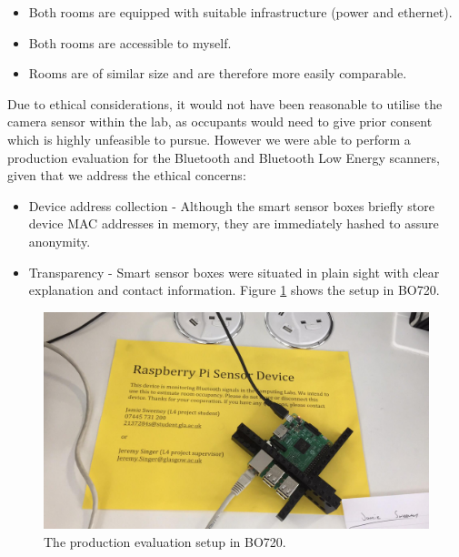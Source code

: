 \documentclass{l4proj}
\begin{document}
\begin{itemize}	
  \item Both rooms are equipped with suitable infrastructure (power and ethernet).
  \item Both rooms are accessible to myself.
  \item Rooms are of similar size and are therefore more easily comparable.
\end{itemize}

Due to ethical considerations, it would not have been reasonable to utilise the camera sensor within the lab, as occupants would need to give prior consent which is highly unfeasible to pursue. However we were able to perform a production evaluation for the Bluetooth and Bluetooth Low Energy scanners, given that we address the ethical concerns:
\begin{itemize}	
  \item Device address collection - Although the smart sensor boxes briefly store device MAC addresses in memory, they are immediately hashed to assure anonymity.
  \item Transparency - Smart sensor boxes were situated in plain sight with clear explanation and contact information. Figure \ref{fig:testrpi} shows the setup in BO720.
\end{itemize}
\begin{figure}
\centering
\includegraphics[width=\textwidth]{testrpi}
\caption{The production evaluation setup in BO720.}
\label{fig:testrpi}
\end{figure}
\end{document}
